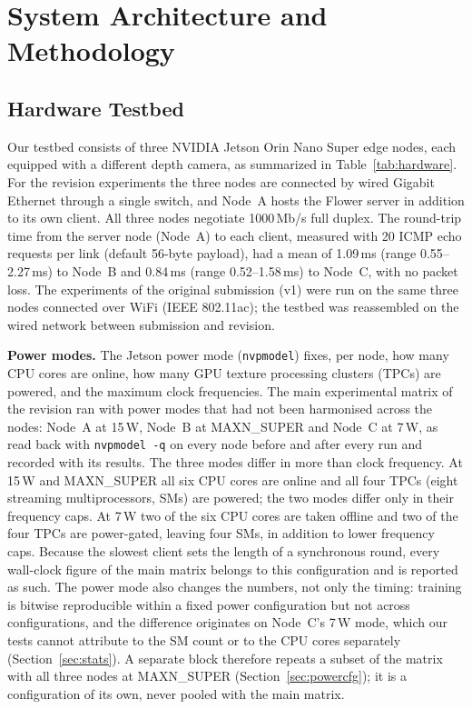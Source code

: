 \documentclass[journal]{IEEEtran}
\begin{document}
\section{System Architecture and Methodology}
\label{sec:methodology}

\subsection{Hardware Testbed}
\label{sec:testbed}

Our testbed consists of three NVIDIA Jetson Orin Nano Super edge nodes, each equipped with a different depth camera, as summarized in Table~\ref{tab:hardware}. For the revision experiments the three nodes are connected by wired Gigabit Ethernet through a single switch, and Node~A hosts the Flower server in addition to its own client. All three nodes negotiate 1000\,Mb/s full duplex. The round-trip time from the server node (Node~A) to each client, measured with 20 ICMP echo requests per link (default 56-byte payload), had a mean of 1.09\,ms (range 0.55--2.27\,ms) to Node~B and 0.84\,ms (range 0.52--1.58\,ms) to Node~C, with no packet loss. The experiments of the original submission (v1) were run on the same three nodes connected over WiFi (IEEE 802.11ac); the testbed was reassembled on the wired network between submission and revision.

\textbf{Power modes.} The Jetson power mode (\texttt{nvpmodel}) fixes, per node, how many CPU cores are online, how many GPU texture processing clusters (TPCs) are powered, and the maximum clock frequencies. The main experimental matrix of the revision ran with power modes that had not been harmonised across the nodes: Node~A at 15\,W, Node~B at MAXN\_SUPER and Node~C at 7\,W, as read back with \texttt{nvpmodel -q} on every node before and after every run and recorded with its results. The three modes differ in more than clock frequency. At 15\,W and MAXN\_SUPER all six CPU cores are online and all four TPCs (eight streaming multiprocessors, SMs) are powered; the two modes differ only in their frequency caps. At 7\,W two of the six CPU cores are taken offline and two of the four TPCs are power-gated, leaving four SMs, in addition to lower frequency caps. Because the slowest client sets the length of a synchronous round, every wall-clock figure of the main matrix belongs to this configuration and is reported as such. The power mode also changes the numbers, not only the timing: training is bitwise reproducible within a fixed power configuration but not across configurations, and the difference originates on Node~C's 7\,W mode, which our tests cannot attribute to the SM count or to the CPU cores separately (Section~\ref{sec:stats}). A separate block therefore repeats a subset of the matrix with all three nodes at MAXN\_SUPER (Section~\ref{sec:powercfg}); it is a configuration of its own, never pooled with the main matrix.
\end{document}

